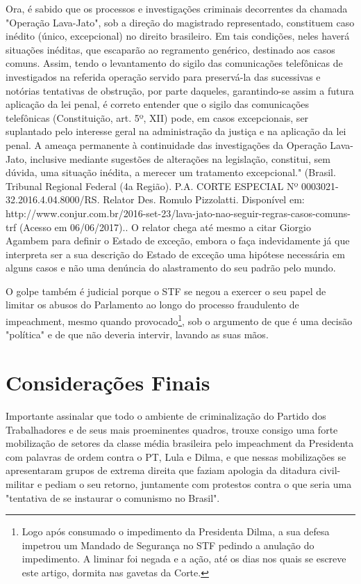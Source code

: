 {  Ora, é sabido que os processos e investigações criminais decorrentes
  da chamada "Operação Lava-Jato", sob a direção do magistrado
  representado, constituem caso inédito (único, excepcional) no direito
  brasileiro. Em tais condições, neles haverá situações inéditas, que
  escaparão ao regramento genérico, destinado aos casos comuns. Assim,
  tendo o levantamento do sigilo das comunicações telefônicas de
  investigados na referida operação servido para preservá-la das
  sucessivas e notórias tentativas de obstrução, por parte daqueles,
  garantindo-se assim a futura aplicação da lei penal, é correto
  entender que o sigilo das comunicações telefônicas (Constituição, art.
  5º, XII) pode, em casos excepcionais, ser suplantado pelo interesse
  geral na administração da justiça e na aplicação da lei penal. A
  ameaça permanente à continuidade das investigações da Operação
  Lava-Jato, inclusive mediante sugestões de alterações na legislação,
  constitui, sem dúvida, uma situação inédita, a merecer um tratamento
  excepcional." (Brasil. Tribunal Regional Federal (4a Região). P.A.
  CORTE ESPECIAL Nº 0003021-32.2016.4.04.8000/RS. Relator Des. Romulo
  Pizzolatti. Disponível em:
  http://www.conjur.com.br/2016-set-23/lava-jato-nao-seguir-regras-casos-comuns-trf
  (Acesso em 06/06/2017).}. O relator chega até mesmo a citar Giorgio
Agambem para definir o Estado de exceção, embora o faça indevidamente já
que interpreta ser a sua descrição do Estado de exceção uma hipótese
necessária em alguns casos e não uma denúncia do alastramento do seu
padrão pelo mundo.

O golpe também é judicial porque o STF se negou a exercer o seu papel de
limitar os abusos do Parlamento ao longo do processo fraudulento de
impeachment, mesmo quando provocado\footnote{Logo após consumado o
  impedimento da Presidenta Dilma, a sua defesa impetrou um Mandado de
  Segurança no STF pedindo a anulação do impedimento. A liminar foi
  negada e a ação, até os dias nos quais se escreve este artigo, dormita
  nas gavetas da Corte.}, sob o argumento de que é uma decisão
"política" e de que não deveria intervir, lavando as suas mãos.

\section{Considerações Finais}

Importante assinalar que todo o ambiente de criminalização do Partido
dos Trabalhadores e de seus mais proeminentes quadros, trouxe consigo
uma forte mobilização de setores da classe média brasileira pelo
impeachment da Presidenta com palavras de ordem contra o PT, Lula e
Dilma, e que nessas mobilizações se apresentaram grupos de extrema
direita que faziam apologia da ditadura civil-militar e pediam o seu
retorno, juntamente com protestos contra o que seria uma "tentativa de
se instaurar o comunismo no Brasil".

